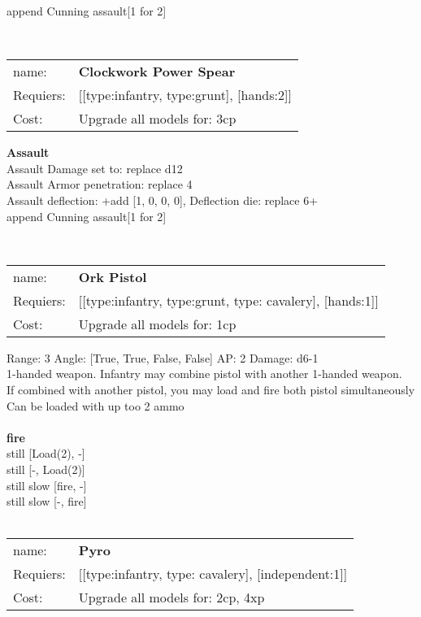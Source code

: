append Cunning assault[1 for 2]


\ \\
\begin{tabular}{ll}
name: & {\bf Clockwork Power Spear } \\
Requiers: & [[type:infantry, type:grunt], [hands:2]] \\
Cost: & Upgrade all models for: 3cp \\
\end{tabular}





{\bf Assault} \ \\
Assault Damage set to: replace d12
\\ 
Assault Armor penetration: replace 4 
\\ 
Assault deflection: +add [1, 0, 0, 0], Deflection die: replace 6+
\\ 

append Cunning assault[1 for 2]


\ \\
\begin{tabular}{ll}
name: & {\bf Ork Pistol } \\
Requiers: & [[type:infantry, type:grunt, type: cavalery], [hands:1]] \\
Cost: & Upgrade all models for: 1cp \\
\end{tabular}



Range: 3  Angle: [True, True, False, False] AP: 2 Damage: d6-1 \\
1-handed weapon. Infantry may combine pistol with another 1-handed weapon.\\ 
If combined with another pistol, you may load and fire both pistol simultaneously\\ 
Can be loaded with up too 2 ammo\\ 







\ \\ {\bf fire } \\
still [Load(2), -] \\
still [-, Load(2)] \\
still slow [fire, -] \\
still slow [-, fire] \\

\ \\
\begin{tabular}{ll}
name: & {\bf Pyro } \\
Requiers: & [[type:infantry, type: cavalery], [independent:1]] \\
Cost: & Upgrade all models for: 2cp, 4xp \\
\end{tabular}



